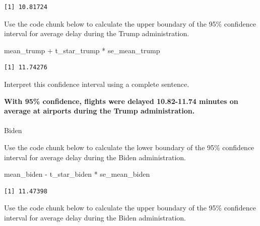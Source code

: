\documentclass[
  letterpaper,
  DIV=11,
  numbers=noendperiod]{scrartcl}
\makeatletter
\let\oldparagraph\paragraph
\renewcommand{\paragraph}{
    \@ifstar
      \xxxParagraphStar
      \xxxParagraphNoStar
  }
\newcommand{\xxxParagraphStar}[1]{\oldparagraph*{#1}\mbox{}}
\newcommand{\xxxParagraphNoStar}[1]{\oldparagraph{#1}\mbox{}}
\newenvironment{Shaded}{\begin{snugshade}}{\end{snugshade}}
\newcommand{\NormalTok}[1]{\textcolor[rgb]{0.00,0.23,0.31}{#1}}
\newcommand{\SpecialCharTok}[1]{\textcolor[rgb]{0.37,0.37,0.37}{#1}}
\makeatother
\begin{document}
\begin{verbatim}
[1] 10.81724
\end{verbatim}

Use the code chunk below to calculate the upper boundary of the 95\%
confidence interval for average delay during the Trump administration.

\begin{Shaded}
\begin{Highlighting}[]
\NormalTok{mean\_trump }\SpecialCharTok{+}\NormalTok{ t\_star\_trump }\SpecialCharTok{*}\NormalTok{ se\_mean\_trump}
\end{Highlighting}
\end{Shaded}

\begin{verbatim}
[1] 11.74276
\end{verbatim}

Interpret this confidence interval using a complete sentence.

\begin{tcolorbox}[enhanced jigsaw, colback=white, breakable, arc=.35mm, left=2mm, colframe=quarto-callout-warning-color-frame, opacityback=0, rightrule=.15mm, toprule=.15mm, bottomrule=.15mm, leftrule=.75mm]

\textbf{With 95\% confidence, flights were delayed 10.82-11.74 minutes
on average at airports during the Trump administration.}

\end{tcolorbox}

\paragraph{Biden}\label{biden-1}

Use the code chunk below to calculate the lower boundary of the 95\%
confidence interval for average delay during the Biden administration.

\begin{Shaded}
\begin{Highlighting}[]
\NormalTok{mean\_biden }\SpecialCharTok{{-}}\NormalTok{ t\_star\_biden }\SpecialCharTok{*}\NormalTok{ se\_mean\_biden}
\end{Highlighting}
\end{Shaded}

\begin{verbatim}
[1] 11.47398
\end{verbatim}

Use the code chunk below to calculate the upper boundary of the 95\%
confidence interval for average delay during the Biden administration.
\end{document}
